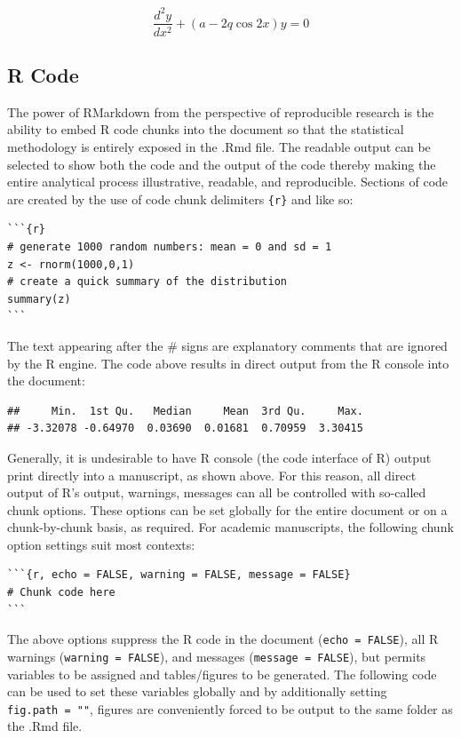 \documentclass[]{elsarticle} %
\begin{document}
\[\frac{d^2y}{dx^2} + (a-2q\cos2x)y = 0\]

\hypertarget{r-code}{%
\subsection{R Code}\label{r-code}}

The power of RMarkdown from the perspective of reproducible research is
the ability to embed R code chunks into the document so that the
statistical methodology is entirely exposed in the .Rmd file. The
readable output can be selected to show both the code and the output of
the code thereby making the entire analytical process illustrative,
readable, and reproducible. Sections of code are created by the use of
code chunk delimiters
\texttt{\textasciigrave{}\textasciigrave{}\textasciigrave{}\{r\}} and
\texttt{\textasciigrave{}\textasciigrave{}\textasciigrave{}} like so:

\begin{verbatim}
```{r}
# generate 1000 random numbers: mean = 0 and sd = 1
z <- rnorm(1000,0,1)
# create a quick summary of the distribution
summary(z)
```
\end{verbatim}

The text appearing after the \# signs are explanatory comments that are
ignored by the R engine. The code above results in direct output from
the R console into the document:

\begin{verbatim}
##     Min.  1st Qu.   Median     Mean  3rd Qu.     Max. 
## -3.32078 -0.64970  0.03690  0.01681  0.70959  3.30415
\end{verbatim}

Generally, it is undesirable to have R console (the code interface of R)
output print directly into a manuscript, as shown above. For this
reason, all direct output of R's output, warnings, messages can all be
controlled with so-called chunk options. These options can be set
globally for the entire document or on a chunk-by-chunk basis, as
required. For academic manuscripts, the following chunk option settings
suit most contexts:

\begin{verbatim}
```{r, echo = FALSE, warning = FALSE, message = FALSE}
# Chunk code here
```
\end{verbatim}

The above options suppress the R code in the document
(\texttt{echo\ =\ FALSE}), all R warnings (\texttt{warning\ =\ FALSE}),
and messages (\texttt{message\ =\ FALSE}), but permits variables to be
assigned and tables/figures to be generated. The following code can be
used to set these variables globally and by additionally setting
\texttt{fig.path\ =\ ""}, figures are conveniently forced to be output
to the same folder as the .Rmd file.
\end{document}
